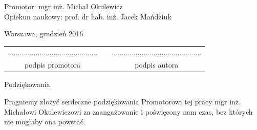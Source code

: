 \documentclass[12pt, twoside, openany, abstract=on]{report}
\theoremstyle{definition}
\begin{document}
\begin{titlepage}
\begin{center}
\end{center}
\vfill
\begin{center}
\Large
Promotor: mgr inż. Michał Okulewicz\\
Opiekun naukowy: prof. dr hab. inż. Jacek Mańdziuk
\end{center}
\vfill
\begin{center}
\large
Warszawa, grudzień 2016
\end{center}
\newpage
\hfill
\begin{table}[b]
\centering
\begin{tabular}[t]{ccc}
............................................. & \hspace*{100pt} & .............................................\\
podpis promotora & \hspace*{100pt} & podpis autora
\end{tabular}
\end{table}


\end{titlepage}

\thispagestyle{empty}
\newpage
\pagestyle{headings}
\setcounter{page}{1}



\thispagestyle{empty}
\newpage
\pagestyle{headings}
\setcounter{page}{1}
\begin{center}
\Large
Podziękowania
\end{center}
\vfill
\begin{center}
Pragniemy złożyć serdeczne podziękowania Promotorowi tej pracy mgr inż. Michałowi Okulewiczowi za zaangażowanie i poświęcony nam czas, bez których nie mogłaby ona powstać.
\end{center}
\vfill\vfill\vfill\vfill
\end{document}
